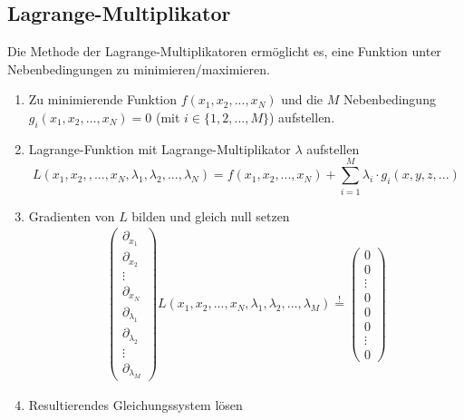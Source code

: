 \documentclass{article}
\begin{document}
\newpage


\subsection{Lagrange-Multiplikator}
Die Methode der Lagrange-Multiplikatoren ermöglicht es, eine Funktion unter Nebenbedingungen zu minimieren/maximieren.
	\begin{enumerate}
		\item Zu minimierende Funktion $f(x_1,x_2,...,x_N)$ und die $M$ Nebenbedingung $g_i(x_1,x_2,...,x_N) = 0$ (mit $i\in\{1,2,...,M\}$) aufstellen.
		
		\item Lagrange-Funktion mit Lagrange-Multiplikator $\lambda$ aufstellen
		\begin{equation}
			L(x_1,x_2,,...,x_N,\lambda_1, \lambda_2,...,\lambda_N) = f(x_1,x_2,...,x_N) + \sum_{i=1}^M \lambda_i \cdot g_i(x,y,z,...)
		\end{equation}
		
		\item Gradienten von $L$ bilden und gleich null setzen
			\begin{align}
			\begin{pmatrix}
				\partial_{x_1}\\
				\partial_{x_2}\\
				\vdots\\
				\partial_{x_N}\\
				\partial_{\lambda_1}\\
				\partial_{\lambda_2}\\
				\vdots\\
				\partial_{\lambda_M}
			\end{pmatrix}
			L(x_1,x_2,...,x_N,\lambda_1, \lambda_2,...,\lambda_M)
			\stackrel{!}{=}
			\begin{pmatrix}
				0\\
				0\\
				\vdots\\
				0\\
				0\\
				0\\
				\vdots\\
				0
			\end{pmatrix}
			\end{align}
			
		\item Resultierendes Gleichungssystem lösen
	\end{enumerate}

\vspace{0.5cm}
\end{document}
